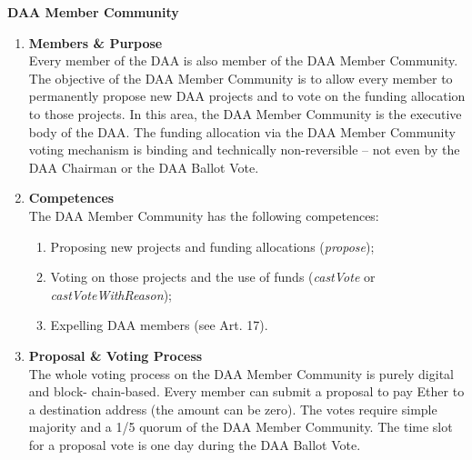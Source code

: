\item \textbf{DAA Member Community} \\
\begin{enumerate}[label=\textbf{\arabic*.}]
    \item \textbf{Members \& Purpose} \\
    Every member of the DAA is also member of the DAA Member Community.
    The objective of the DAA Member Community is to allow every member to permanently propose new DAA projects and to vote on the funding allocation to those projects. %
    In this area, the DAA Member Community is the executive body of the DAA.
    The funding allocation via the DAA Member Community voting mechanism is binding and technically non-reversible – not even by the DAA Chairman or the DAA Ballot Vote.

    \item \textbf{Competences} \\
    The DAA Member Community has the following competences:
    \begin{enumerate}
        [label=(\alph*)]
        \item Proposing new projects and funding allocations (\emph{propose});
        \item Voting on those projects and the use of funds (\emph{castVote} or \emph{castVoteWithReason});
        \item Expelling DAA members (see Art. 17).
    \end{enumerate}

    \item \textbf{Proposal \& Voting Process} \\
    The whole voting process on the DAA Member Community is purely digital and block- chain-based.
    Every member can submit a proposal to pay Ether to a destination address (the amount can be zero).
    The votes require simple majority and a 1/5 quorum of the DAA Member Community.
    The time slot for a proposal vote is one day during the DAA Ballot Vote.
\end{enumerate}
